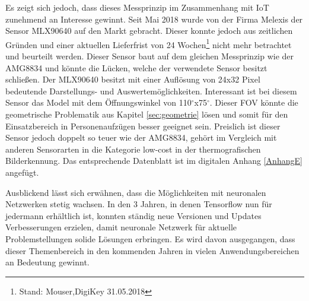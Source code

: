 Es zeigt sich jedoch, dass dieses Messprinzip im Zusammenhang mit \ac{IoT} zunehmend an Interesse gewinnt.  Seit Mai 2018 wurde von der Firma Melexis der Sensor MLX90640 auf den Markt gebracht. Dieser konnte jedoch aus zeitlichen Gründen und einer aktuellen Lieferfrist von 24 Wochen\footnote{Stand: Mouser,DigiKey 31.05.2018 } nicht mehr betrachtet und beurteilt werden.
Dieser Sensor baut auf dem gleichen Messprinzip wie der AMG8834 und könnte die Lücken, welche der verwendete Sensor besitzt schließen. Der MLX90640 besitzt mit einer Auflösung von 24x32 Pixel bedeutende Darstellungs- und Auswertemöglichkeiten. Interessant ist bei diesem Sensor das Model mit dem Öffnungswinkel von 110$^\circ$x75$^\circ$. Dieser \ac{FOV} könnte die geometrische Problematik aus Kapitel \ref{sec:geometrie} lösen und somit für den Einsatzbereich in Personenaufzügen besser geeignet sein. Preislich ist dieser Sensor jedoch doppelt so teuer wie der AMG8834, gehört im Vergleich mit anderen Sensorarten in die Kategorie low-cost in der thermografischen Bilderkennung. Das entsprechende Datenblatt ist im digitalen Anhang \ref{AnhangE} angefügt.

Ausblickend lässt sich erwähnen, dass die Möglichkeiten mit neuronalen Netzwerken stetig wachsen. In den 3 Jahren, in denen Tensorflow nun für jedermann erhältlich ist, konnten ständig neue Versionen und Updates Verbesserungen erzielen, damit neuronale Netzwerk für aktuelle Problemstellungen solide Lösungen erbringen. Es wird davon ausgegangen, dass dieser Themenbereich in den kommenden Jahren in vielen Anwendungsbereichen an Bedeutung gewinnt.